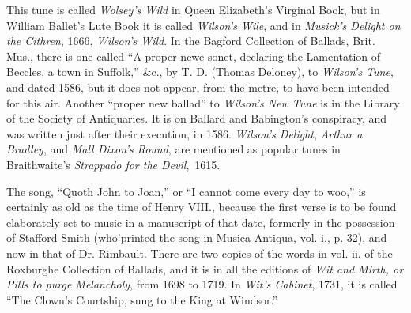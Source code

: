 
This tune is called \textit{Wolsey's Wild} in Queen Elizabeth’s Virginal Book, but in
William Ballet’s Lute Book it is called \textit{Wilson's Wile}, and in \textit{Musick's Delight
on the Cithren}, 1666, \textit{Wilson's Wild}. In the Bagford Collection of Ballads,
Brit. Mus., there is one called “A proper newe sonet, declaring the Lamentation
of Beccles, a town in Suffolk,” \&c., by T. D. (Thomas Deloney), to \textit{Wilson's Tune},
and dated 1586, but it does not appear, from the metre, to have been intended
for this air. Another “proper new ballad” \pagebreak to \textit{Wilson's New Tune} is in the
Library of the Society of Antiquaries. It is on Ballard and Babington’s conspiracy,
and was written just after their execution, in 1586. \textit{Wilson’s Delight},
\textit{Arthur a Bradley}, and \textit{Mall Dixon’s Round}, are mentioned as popular tunes in
Braithwaite’s \textit{Strappado for the Devil},~1615.

The song, “Quoth John to Joan,” or “I cannot come every day to woo,” is
certainly as old as the time of Henry VIII., because the first verse is to be found
elaborately set to music in a manuscript of that date, formerly in the possession
of Stafford Smith (who'printed the song in Musica Antiqua, vol. i., p. 32), and now
in that of Dr. Rimbault. There are two copies of the words in vol. ii. of the
Roxburghe Collection of Ballads, and it is in all the editions of \textit{Wit and Mirth, or\textit{
Pills to purge Melancholy}}, from 1698 to 1719. In \textit{Wit’s Cabinet}, 1731, it is
called “The Clown’s Courtship, sung to the King at Windsor.”


